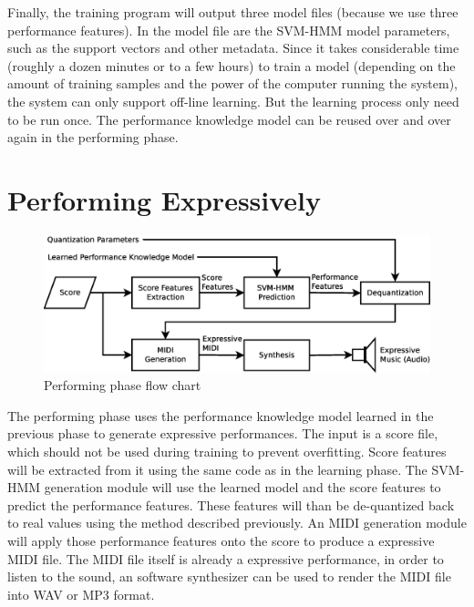 Finally, the training program will output three model files (because we use three performance features). In the model file are the SVM-HMM model parameters, such as the support vectors and other metadata. Since it takes considerable time (roughly a dozen minutes or to a few hours) to train a model (depending on the amount of training samples and the power of the computer running the system), the system can only support off-line learning. But the learning process only need to be run once. The performance knowledge model can be reused over and over again in the performing phase.



\section{Performing Expressively}
   \begin{figure}[tp]
      \begin{center}
         \includegraphics[width=\textwidth]{fig/perf_arch}
      \end{center}
      \caption{Performing phase flow chart} 
      \label{fig:perfflow}
   \end{figure}
The performing phase uses the performance knowledge model learned in the previous phase to generate expressive performances. The input is a score file, which should not be used during training to prevent overfitting. Score features will be extracted from it using the same code as in the learning phase. The SVM-HMM generation module will use the learned model and the score features to predict the performance features. These features will than be de-quantized back to real values using the method described previously. An MIDI generation module will apply those performance features onto the score to produce a expressive MIDI file. The MIDI file itself is already a expressive performance, in order to listen to the sound, an software synthesizer can be used to render the MIDI file into WAV or MP3 format.
